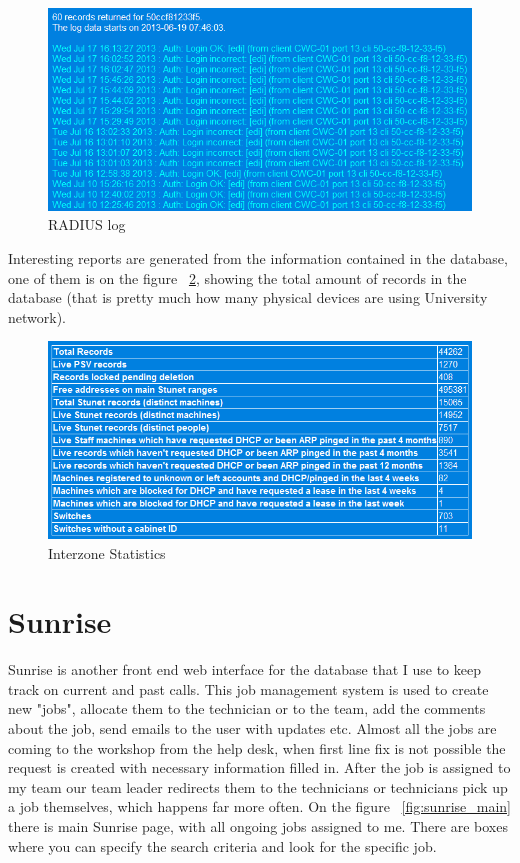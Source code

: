 \documentclass[10pt,a4paper,headinclude=true,twoside]{report}
\begin{document}
\begin{figure}[H]
\centering
\centerline{\includegraphics[scale=0.5]{./interzone_radius}}
\caption{RADIUS log}
\label{fig:interzone_radius}
\end{figure}

Interesting reports are generated from the information contained in the database, one of them is on the figure ~\ref{fig:interzone_statistics}, showing the total amount of records in the database (that is pretty much how many physical devices are using University network).

\begin{figure}[H]
\centering
\centerline{\includegraphics[scale=0.5]{./interzone_statistics}}
\caption{Interzone Statistics}
\label{fig:interzone_statistics}
\end{figure}

\section{Sunrise}
Sunrise is another front end web interface for the database that I use to keep track on current and past calls. This job management system is used to create new "jobs", allocate them to the technician or to the team, add the comments about the job, send emails to the user with updates etc. Almost all the jobs are coming to the workshop from the help desk, when first line fix is not possible the request is created with necessary information filled in. After the job is assigned to my team our team leader redirects them to the technicians or technicians pick up a job themselves, which happens far more often. On the figure ~\ref{fig:sunrise_main} there is main Sunrise page, with all ongoing jobs assigned to me. There are boxes where you can specify the search criteria and look for the specific job.
\end{document}
